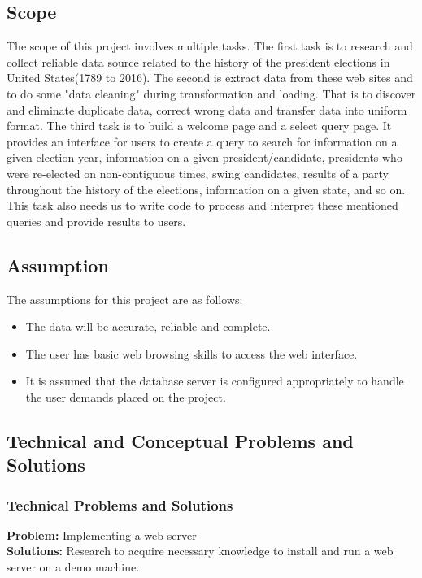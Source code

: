 \documentclass{article}
\begin{document}
\subsection{Scope}
The scope of this project involves multiple tasks. The first task is to research and collect reliable data source related to the history of the president elections in United States(1789 to 2016). The second is extract data from these web sites and to do some "data cleaning" during transformation and loading. That is to discover and eliminate duplicate data, correct wrong data and transfer data into uniform format. The third task is to build a welcome page and a select query page. It provides an interface for users to create a query to search for information on a given election year, information on a given president/candidate, presidents who were re-elected on non-contiguous times, swing candidates, results of a party throughout the history of the elections, information on a given state, and so on. This task also needs us to write code to process and interpret these mentioned queries and provide results to users.

\subsection{Assumption}
The assumptions for this project are as follows:
\begin{itemize}
	\item The data will be accurate, reliable and complete.
	\item The user has basic web browsing skills to access the web interface.
	\item It is assumed that the database server is configured appropriately to handle
the user demands placed on the project.
\end{itemize}

\subsection{Technical and Conceptual Problems and Solutions}
\subsubsection{Technical Problems and Solutions}
{\bfseries Problem:} Implementing a web server\\
{\bfseries Solutions:} Research to acquire necessary knowledge to install and run a web server on a demo machine.\\
\end{document}
